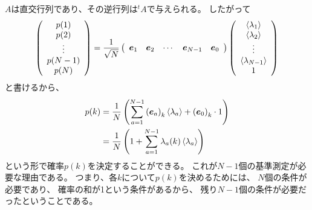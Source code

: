 \documentclass[a4paper, 10pt]{jsarticle}
\begin{document}
$A$は直交行列であり、その逆行列は$^t\!A$で与えられる。
したがって
\begin{align}
	\left( \begin{array}{c}
		p(1) \\
		p(2) \\
		\vdots \\
		p(N-1) \\
		p(N)
	\end{array} \right)
	= \frac{1}{\sqrt{N}} \left( \begin{array}{ccccc}
		\vec{e}_1 & \vec{e}_2 & \cdots & \vec{e}_{N-1} & \vec{e}_0
	\end{array} \right) \left( \begin{array}{c}
		\Braket{\lambda_1} \\
		\Braket{\lambda_2} \\
		\vdots \\
		\Braket{\lambda_{N-1}} \\
		1
	\end{array} \right)
\end{align}
と書けるから、
\begin{align}
	p(k) &= \frac{1}{N} \left( 
		\sum_{a=1}^{N-1} \left( \vec{e}_a \right)_k \Braket{\lambda_a}
		+ \left( \vec{e}_0 \right)_k \cdot 1
	\right) \\
	&= \frac{1}{N} \left(
		1 + \sum_{a=1}^{N-1} \lambda_a (k) \Braket{\lambda_a}
	\right)
	\label{確率}
\end{align}
という形で確率$p(k)$を決定することができる。
これが$N-1$個の基準測定が必要な理由である。
つまり、各$k$について$p(k)$を決めるためには、
$N$個の条件が必要であり、
確率の和が1という条件があるから、
残り$N-1$個の条件が必要だったということである。
\end{document}
